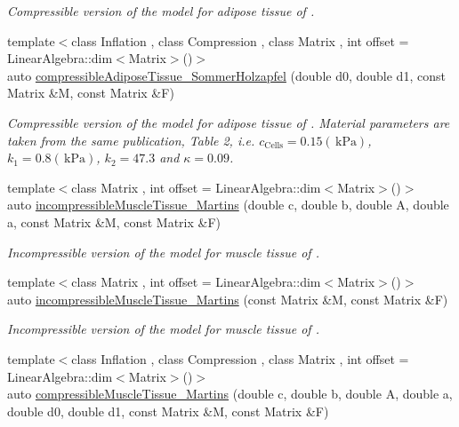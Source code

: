 \begin{DoxyCompactItemize}
\begin{DoxyCompactList}\small\item\em Compressible version of the model for adipose tissue of \cite{Sommer2013}. \end{DoxyCompactList}\item 
{\footnotesize template$<$class Inflation , class Compression , class Matrix , int offset = Linear\-Algebra\-::dim$<$\-Matrix$>$()$>$ }\\auto \hyperlink{group__Biomechanics_ga27bb3f7c579ce8c21a69ea4d4d0169d7}{compressible\-Adipose\-Tissue\-\_\-\-Sommer\-Holzapfel} (double d0, double d1, const Matrix \&M, const Matrix \&F)
\begin{DoxyCompactList}\small\item\em Compressible version of the model for adipose tissue of \cite{Sommer2013}. Material parameters are taken from the same publication, Table 2, i.\-e. $c_\mathrm{Cells}=0.15 (\,\mathrm{kPa})$, $k_1=0.8 (\,\mathrm{kPa})$, $k_2=47.3$ and $\kappa=0.09$. \end{DoxyCompactList}\item 
{\footnotesize template$<$class Matrix , int offset = Linear\-Algebra\-::dim$<$\-Matrix$>$()$>$ }\\auto \hyperlink{group__Biomechanics_gafcc36a1958899ca9246c4c1b3c9bfd85}{incompressible\-Muscle\-Tissue\-\_\-\-Martins} (double c, double b, double A, double a, const Matrix \&M, const Matrix \&F)
\begin{DoxyCompactList}\small\item\em Incompressible version of the model for muscle tissue of \cite{Martins1998}. \end{DoxyCompactList}\item 
{\footnotesize template$<$class Matrix , int offset = Linear\-Algebra\-::dim$<$\-Matrix$>$()$>$ }\\auto \hyperlink{group__Biomechanics_ga9e414585a90b1988e9fa88d17d875055}{incompressible\-Muscle\-Tissue\-\_\-\-Martins} (const Matrix \&M, const Matrix \&F)
\begin{DoxyCompactList}\small\item\em Incompressible version of the model for muscle tissue of \cite{Martins1998}. \end{DoxyCompactList}\item 
{\footnotesize template$<$class Inflation , class Compression , class Matrix , int offset = Linear\-Algebra\-::dim$<$\-Matrix$>$()$>$ }\\auto \hyperlink{group__Biomechanics_gad831914c493a3da04ed40c3c0ce87a62}{compressible\-Muscle\-Tissue\-\_\-\-Martins} (double c, double b, double A, double a, double d0, double d1, const Matrix \&M, const Matrix \&F)

\end{DoxyCompactItemize}
